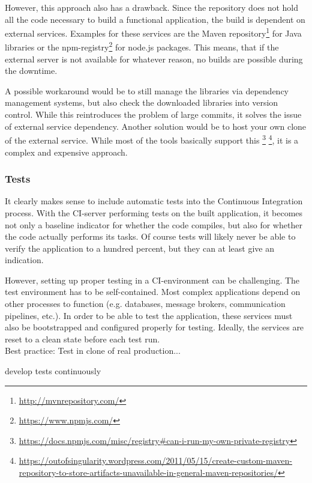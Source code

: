 However, this approach also has a drawback. Since the repository does not hold
all the code necessary to build a functional application, the build is dependent
on external services. Examples for these services are the Maven
repository\footnote{\url{http://mvnrepository.com/}} for Java libraries or the
npm-registry\footnote{\url{https://www.npmjs.com/}} for node.js packages. This
means, that if the external server is not available for whatever reason, no
builds are possible during the downtime.

A possible workaround would be to still manage the libraries via dependency
management systems, but also check the downloaded libraries into version
control. While this reintroduces the problem of large commits, it solves the
issue of external service dependency. Another solution would be to host your own
clone of the external service. While most of the tools basically support this
\footnote{\url{https://docs.npmjs.com/misc/registry\#can-i-run-my-own-private-registry}}
\footnote{\url{https://outofsingularity.wordpress.com/2011/05/15/create-custom-maven-repository-to-store-artifacts-unavailable-in-general-maven-repositories/}},
it is a complex and expensive approach.

\subsubsection{Tests}\label{sec:tests}

It clearly makes sense to include automatic tests into the Continuous
Integration process. With the CI-server performing tests on the built
application, it becomes not only a baseline indicator for whether the code
compiles, but also for whether the code actually performs its tasks. Of course
tests will likely never be able to verify the application to a hundred percent,
but they can at least give an indication.

However, setting up proper testing in a CI-environment can be challenging. The
test environment has to be self-contained. Most complex applications depend on
other processes to function (e.g. databases, message brokers, communication
pipelines, etc.). In order to be able to test the application, these services
must also be bootstrapped and configured properly for testing. Ideally, the
services are reset to a clean state before each test run. \\

Best practice: Test in clone of real production...

develop tests continuously

